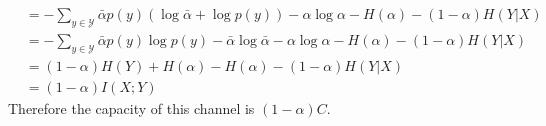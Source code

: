\begin{exercise}
\begin{solution}
\begin{equation}
\begin{aligned}
      &= - \sum_{y\in\mathcal{Y}} \bar{\alpha}p(y) \left( \log \bar{\alpha} + \log p(y) \right)  - \alpha\log\alpha - H(\alpha) -  (1-\alpha) H(Y|X) \\
      &= - \sum_{y\in\mathcal{Y}} \bar{\alpha} p(y)  \log p(y) -\bar{\alpha}\log\bar{\alpha} - \alpha\log\alpha - H(\alpha) -  (1-\alpha) H(Y|X) \\
      &= (1-\alpha) H(Y) + H(\alpha)  - H(\alpha)  -  (1-\alpha) H(Y|X)  \\
      &= (1-\alpha) I(X;Y)
    \end{aligned}
  \end{equation}
  Therefore the capacity of this channel is $(1-\alpha)C$.
  \end{solution}
  \label{ex5}
\end{exercise}

